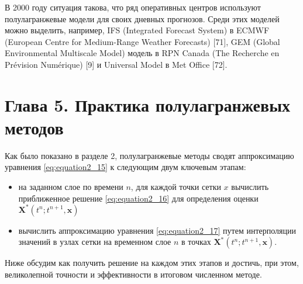 В 2000 году ситуация такова, что ряд оперативных центров используют полулагранжевые модели для своих дневных прогнозов. Среди этих моделей можно выделить, например, IFS (Integrated Forecast System) в ECMWF (European Centre for Medium-Range Weather Forecasts) [71], GEM (Global Environmental Multiscale Model) модель в RPN Canada (The Recherche en Prévision Numérique) [9] и Universal Model в Met Office [72].
\chapter*{Глава 5. Практика полулагранжевых методов} \label{chapt_5}
Как было показано в разделе 2, полулагранжевые методы сводят аппроксимацию уравнения \eqref{eq:equation2_15} к следующим двум ключевым этапам:
\begin{itemize}
	\item на заданном слое по времени $n$, для каждой точки сетки $x$ вычислить приближенное решение \eqref{eq:equation2_16} для определения оценки $\mathbf{X}^*(t^n;t^{n+1}, \mathbf{x})$
	\item вычислить аппроксимацию уравнения \eqref{eq:equation2_17} путем интерполяции значений в узлах сетки на временном слое $n$ в точках $\mathbf{X}^*(t^n;t^{n+1}, \mathbf{x})$.
\end{itemize}
Ниже обсудим как получить решение на каждом этих этапов и достичь, при этом, великолепной точности и эффективности в итоговом численном методе.
